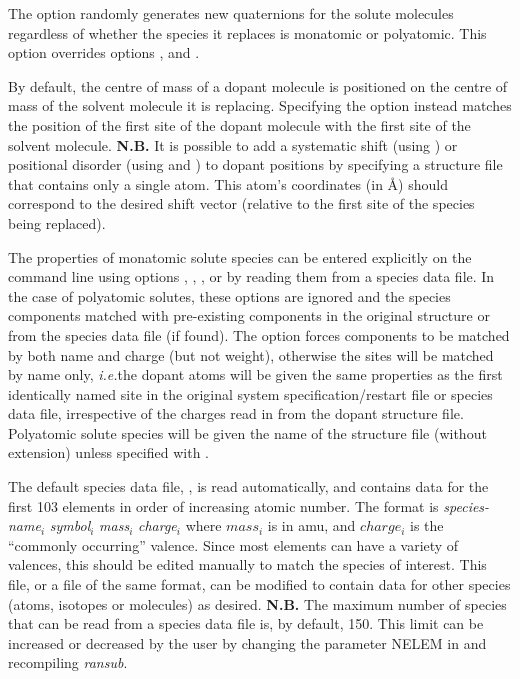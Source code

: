 \documentclass[a4paper,twoside]{report}
\newcommand{\ie}{\emph{i.e.}}
\begin{document}
The  option randomly generates
new quaternions for the solute molecules regardless of whether the species it replaces is
monatomic or polyatomic. This option overrides options ,  and .

By default, the centre of mass of a dopant molecule is positioned on the centre of mass of the solvent molecule it
is replacing. Specifying the  option instead matches the position of the first site of the dopant molecule with
the first site of the solvent molecule.
\textbf{N.B.} It
is possible to add a systematic shift (using ) or positional disorder (using  and ) to dopant positions 
by specifying a structure file that contains only a single atom. This atom's
coordinates (in {\AA}) should correspond to the desired shift vector (relative to the first site 
of the species being
replaced).

The properties of monatomic solute species can be entered explicitly on the command
line using options , , , or by reading them
from a species data file. In the case of polyatomic solutes, these options are ignored and the species components
matched with pre-existing components in the original structure or from the species data file (if found). The  option
forces components to be matched by both name and charge (but not weight), otherwise 
the sites will be matched by name only, \ie the dopant atoms will be given the same properties as the first
identically named site in the original system specification/restart file or species data file, irrespective 
of the charges read in from the dopant structure file. Polyatomic solute species will be given the name of the structure file (without extension) unless specified with .

 The default species data file,
, is read automatically, and contains data for the
first 103 elements in order of increasing atomic number. The format is
{\textit{species-name}$_{i}$ %
                  \textit{symbol}$_{i}$ \textit{mass}$_{i}$} \textit{charge}$_{i}$
where $mass_{i}$ is in amu, and $charge_{i}$ is the ``commonly occurring'' valence.
Since most elements can have a variety of valences, this
should be edited manually to match the species of interest. This file,
or a file of the same format, can be
modified to contain data for other species (atoms, isotopes or molecules)
as desired. \textbf{N.B.} The maximum number of species that can be
read from a species data file is, by default, 150. This limit can be
increased or decreased by the user by changing the parameter NELEM in
 and recompiling \emph{ransub}.
\end{document}
